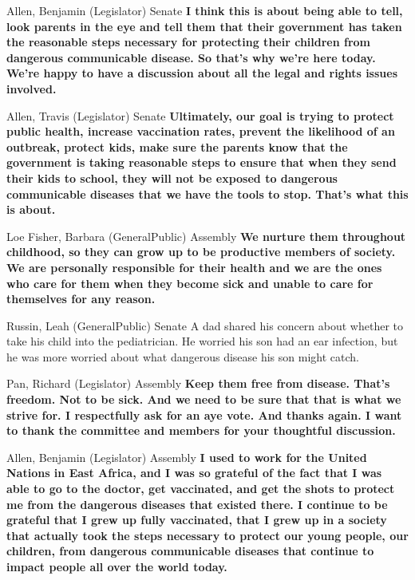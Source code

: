 \begin{result}{9.12646560141058}{Allen, Benjamin (Legislator) Senate}
\textbf{I think this is about being able to tell, look parents in the eye and tell them that their government has taken the reasonable steps necessary for protecting their children from dangerous communicable disease. So that's why we're here today. We're happy to have a discussion about all the legal and rights issues involved.
}\end{result}

\begin{result}{8.329522635997002}{Allen, Travis (Legislator) Senate}
\textbf{Ultimately, our goal is trying to protect public health, increase vaccination rates, prevent the likelihood of an outbreak, protect kids, make sure the parents know that the government is taking reasonable steps to ensure that when they send their kids to school, they will not be exposed to dangerous communicable diseases that we have the tools to stop. That's what this is about.
}\end{result}

\begin{result}{8.24813049999738}{Loe Fisher, Barbara (GeneralPublic) Assembly}
\textbf{We nurture them throughout childhood, so they can grow up to be productive members of society. We are personally responsible for their health and we are the ones who care for them when they become sick and unable to care for themselves for any reason.
}\end{result}

\begin{result}{7.732741683780548}{Russin, Leah (GeneralPublic) Senate}
A dad shared his concern about whether to take his child into the pediatrician. He worried his son had an ear infection, but he was more worried about what dangerous disease his son might catch.
\end{result}

\begin{result}{7.507806725182068}{Pan, Richard (Legislator) Assembly}
\textbf{Keep them free from disease. That's freedom. Not to be sick. And we need to be sure that that is what we strive for. I respectfully ask for an aye vote. And thanks again. I want to thank the committee and members for your thoughtful discussion.
}\end{result}

\begin{result}{7.478195606316017}{Allen, Benjamin (Legislator) Assembly}
\textbf{I used to work for the United Nations in East Africa, and I was so grateful of the fact that I was able to go to the doctor, get vaccinated, and get the shots to protect me from the dangerous diseases that existed there. I continue to be grateful that I grew up fully vaccinated, that I grew up in a society that actually took the steps necessary to protect our young people, our children, from dangerous communicable diseases that continue to impact people all over the world today.
}\end{result}

